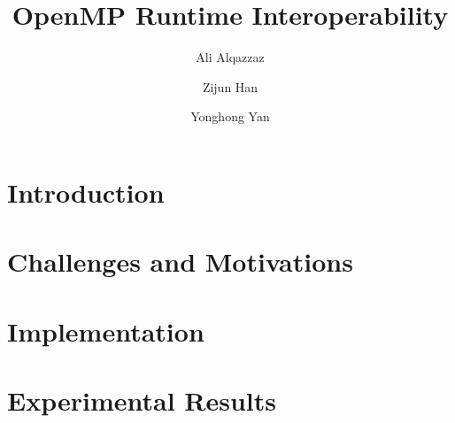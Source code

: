 \documentclass{llncs}
\begin{document}
%
\mainmatter              %
%
\title{OpenMP Runtime Interoperability} %
%
\author{Ali Alqazzaz \and Zijun Han \and Yonghong Yan}

%
%
%
\maketitle              %

\begin{abstract}

\end{abstract}
%

\section{Introduction}\label{sec:intro}


\section{Challenges and Motivations}
\label{sec:motivation}


\section{Implementation}
\label{sec:implementation}


\section{Experimental Results}
\label{sec:results}
 
%
\end{document}
